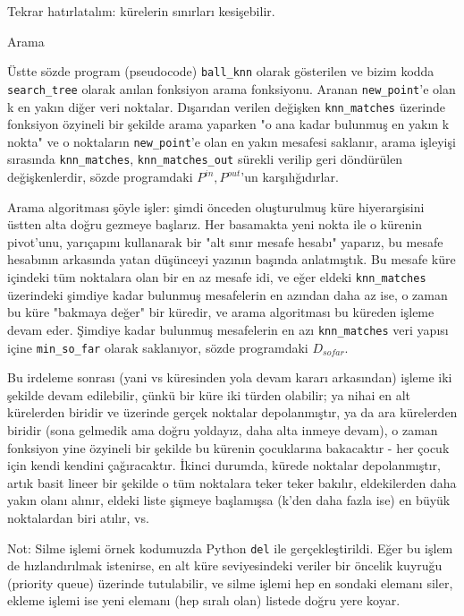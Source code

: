 \documentclass[12pt,fleqn]{article}\usepackage{../../common}
\begin{document}
Tekrar hatırlatalım: kürelerin sınırları kesişebilir.

Arama 

Üstte sözde program (pseudocode) \verb!ball_knn! olarak gösterilen ve bizim
kodda \verb!search_tree! olarak anılan fonksiyon arama fonksiyonu. Aranan
\verb!new_point!'e olan k en yakın diğer veri noktalar. Dışarıdan verilen
değişken \verb!knn_matches! üzerinde fonksiyon özyineli bir şekilde arama
yaparken "o ana kadar bulunmuş en yakın k nokta" ve o noktaların
\verb!new_point!'e olan en yakın mesafesi saklanır, arama işleyişi
sırasında \verb!knn_matches!, \verb!knn_matches_out! sürekli verilip geri
döndürülen değişkenlerdir, sözde programdaki $P^{in},P^{out}$'un
karşılığıdırlar.

Arama algoritması şöyle işler: şimdi önceden oluşturulmuş küre
hiyerarşisini üstten alta doğru gezmeye başlarız. Her basamakta yeni nokta
ile o kürenin pivot'unu, yarıçapını kullanarak bir "alt sınır mesafe
hesabı" yaparız, bu mesafe hesabının arkasında yatan düşünceyi yazının
başında anlatmıştık. Bu mesafe küre içindeki tüm noktalara olan bir en az
mesafe idi, ve eğer eldeki \verb!knn_matches!  üzerindeki şimdiye kadar
bulunmuş mesafelerin en azından daha az ise, o zaman bu küre "bakmaya
değer" bir küredir, ve arama algoritması bu küreden işleme devam
eder. Şimdiye kadar bulunmuş mesafelerin en azı \verb!knn_matches! veri
yapısı içine \verb!min_so_far!  olarak saklanıyor, sözde programdaki
$D_{sofar}$.

Bu irdeleme sonrası (yani vs küresinden yola devam kararı arkasından)
işleme iki şekilde devam edilebilir, çünkü bir küre iki türden
olabilir; ya nihai en alt kürelerden biridir ve üzerinde gerçek
noktalar depolanmıştır, ya da ara kürelerden biridir (sona gelmedik
ama doğru yoldayız, daha alta inmeye devam), o zaman fonksiyon yine
özyineli bir şekilde bu kürenin çocuklarına bakacaktır - her çocuk
için kendi kendini çağıracaktır. İkinci durumda, kürede noktalar
depolanmıştır, artık basit lineer bir şekilde o tüm noktalara teker
teker bakılır, eldekilerden daha yakın olanı alınır, eldeki liste
şişmeye başlamışsa (k'den daha fazla ise) en büyük noktalardan biri
atılır, vs.

Not: Silme işlemi örnek kodumuzda Python \verb!del! ile
gerçekleştirildi. Eğer bu işlem de hızlandırılmak istenirse, en alt küre
seviyesindeki veriler bir öncelik kuyruğu (priority queue) üzerinde
tutulabilir, ve silme işlemi hep en sondaki elemanı siler, ekleme işlemi
ise yeni elemanı (hep sıralı olan) listede doğru yere koyar.
\end{document}
